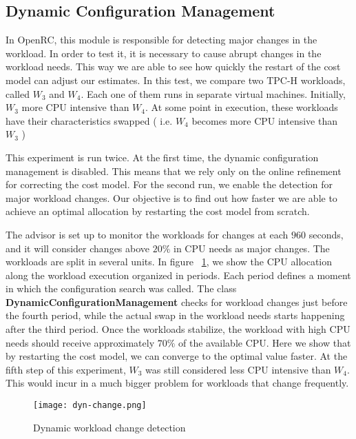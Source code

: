 \subsection{Dynamic Configuration Management}

In OpenRC, this module is responsible for detecting major changes in the workload. In order to test it, it is necessary to cause abrupt changes in the workload needs. This way we are able to see how quickly the restart of the cost model can adjust our estimates. In this test, we compare two TPC-H workloads, called $W_{3}$ and $W_{4}$. Each one of them runs in separate virtual machines. Initially, $W_{3}$ more CPU intensive than $W_{4}$. At some point in execution, these workloads have their characteristics swapped ( i.e. $W_{4}$ becomes more CPU intensive than $W_{3}$ )

This experiment is run twice. At the first time, the dynamic configuration management is disabled. This means that we rely only on the online refinement for correcting the cost model. For the second run, we enable the detection for major workload changes. Our objective is to find out how faster we are able to achieve an optimal allocation by restarting the cost model from scratch.

The advisor is set up to monitor the workloads for changes at each $960$ seconds, and it will consider changes above $20\%$ in CPU needs as major changes. The workloads are split in several units. In figure ~\ref{fig:wkchanges}, we show the CPU allocation along the workload execution organized in periods. Each period defines a moment in which the configuration search was called. The class \textbf{DynamicConfigurationManagement} checks for workload changes just before the fourth period, while the actual swap in the workload needs starts happening after the third period. Once the workloads stabilize, the workload with high CPU needs should receive approximately $70\%$  of the available CPU. Here we show that by restarting the cost model, we can converge to the optimal value faster. At the fifth step of this experiment, $W_{3}$  was still considered less CPU intensive than $W_{4}$. This would incur in a much bigger problem for workloads that change frequently.

\begin{figure}[ht]
 \centering
 \texttt{[image: dyn-change.png]}
 \caption{Dynamic workload change detection}
 \label{fig:wkchanges}
\end{figure} 


